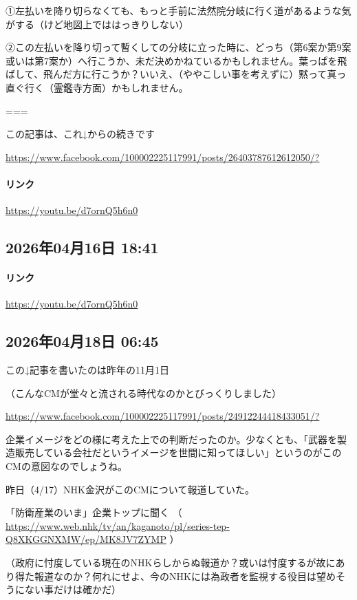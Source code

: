 ①左払いを降り切らなくても、もっと手前に法然院分岐に行く道があるような気がする（けど地図上でははっきりしない）

②この左払いを降り切って暫くしての分岐に立った時に、どっち（第6案か第9案或いは第7案か）へ行こうか、未だ決めかねているかもしれません。葉っぱを飛ばして、飛んだ方に行こうか？いいえ、（ややこしい事を考えずに）黙って真っ直ぐ行く（霊鑑寺方面）かもしれません。

===

この記事は、これ↓からの続きです

\url{https://www.facebook.com/100002225117991/posts/26403787612612050/?}

\paragraph{リンク}
\url{https://youtu.be/d7ornQ5h6n0}

\subsection*{2026年04月16日 18:41}

\paragraph{リンク}
\url{https://youtu.be/d7ornQ5h6n0}

\subsection*{2026年04月18日 06:45}

この↓記事を書いたのは昨年の11月1日

（こんなCMが堂々と流される時代なのかとびっくりしました）

\url{https://www.facebook.com/100002225117991/posts/24912244418433051/?}

企業イメージをどの様に考えた上での判断だったのか。少なくとも、「武器を製造販売している会社だというイメージを世間に知ってほしい」というのがこのCMの意図なのでしょうね。

昨日（4/17）NHK金沢がこのCMについて報道していた。

「防衛産業のいま」企業トップに聞く （ \url{https://www.web.nhk/tv/an/kaganoto/pl/series-tep-Q8XKGGNXMW/ep/MK8JV7ZYMP} ）

（政府に忖度している現在のNHKらしからぬ報道か？或いは忖度するが故にあり得た報道なのか？何れにせよ、今のNHKには為政者を監視する役目は望めそうにない事だけは確かだ）

